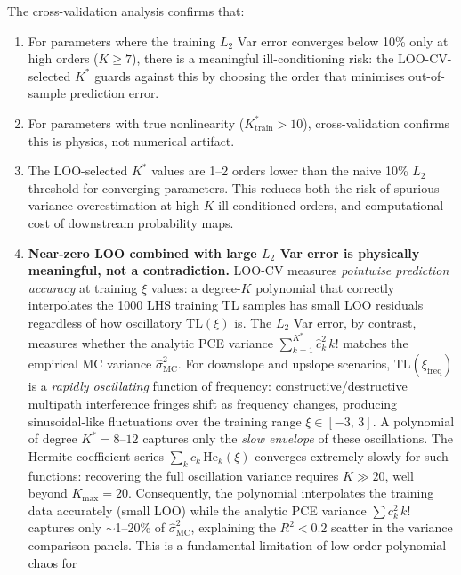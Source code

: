 \documentclass[11pt,a4paper]{article}
\begin{document}
The cross-validation analysis confirms that:
\begin{enumerate}
  \item For parameters where the training $L_2$ Var error converges below 10\% only
        at high orders ($K \geq 7$), there is a meaningful ill-conditioning risk:
        the LOO-CV-selected $K^*$ guards against this by choosing the order that
        minimises out-of-sample prediction error.
  \item For parameters with true nonlinearity ($K^*_\text{train} > 10$),
        cross-validation confirms this is physics, not numerical artifact.
  \item The LOO-selected $K^*$ values are 1--2 orders lower than the naive
        10\% $L_2$ threshold for converging parameters.  This reduces both
        the risk of spurious variance overestimation at high-$K$ ill-conditioned
        orders, and computational cost of downstream probability maps.
  \item \textbf{Near-zero LOO combined with large $L_2$ Var error is physically meaningful,
        not a contradiction.}
        LOO-CV measures \emph{pointwise prediction accuracy} at training
        $\xi$ values: a degree-$K$ polynomial that correctly interpolates the
        1000 LHS training TL samples has small LOO residuals regardless of how
        oscillatory $\mathrm{TL}(\xi)$ is.
        The $L_2$ Var error, by contrast, measures whether the analytic PCE
        variance $\sum_{k=1}^{K^*}\hat{c}_k^2\,k!$ matches the empirical MC
        variance $\widehat{\sigma}^2_{\mathrm{MC}}$.
        For downslope and upslope scenarios, $\mathrm{TL}(\xi_\text{freq})$ is a
        \emph{rapidly oscillating} function of frequency: constructive/destructive
        multipath interference fringes shift as frequency changes, producing
        sinusoidal-like fluctuations over the training range $\xi \in [-3,\,3]$.
        A polynomial of degree $K^*=8$--$12$ captures only the \emph{slow
        envelope} of these oscillations.
        The Hermite coefficient series $\sum_k c_k\,\mathrm{He}_k(\xi)$ converges
        extremely slowly for such functions: recovering the full oscillation
        variance requires $K \gg 20$, well beyond $K_{\max} = 20$.
        Consequently, the polynomial interpolates the training data accurately
        (small LOO) while the analytic PCE variance $\sum c_k^2\,k!$
        captures only $\sim$1--20\% of $\widehat{\sigma}^2_{\mathrm{MC}}$,
        explaining the $R^2 < 0.2$ scatter in the variance comparison panels.
        This is a fundamental limitation of low-order polynomial chaos for

\end{enumerate}
\end{document}
